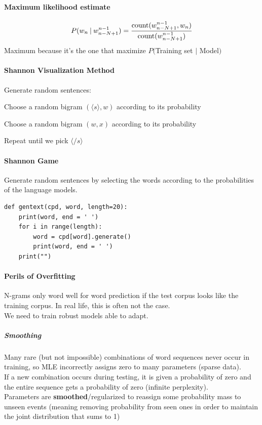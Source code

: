 \documentclass[10pt]{report}
\begin{document}
\paragraph{Maximum likelihood estimate}$$P(w_n\:|\:w_{n-N+1}^{n-1}) = \frac{\hbox{count}(w_{n-N+1}^{n-1},w_n)}{\hbox{count}(w_{n-N+1}^{n-1})}$$
Maximum because it's the one that maximize $P($Training set $|$ Model$)$
\paragraph{Shannon Visualization Method} Generate random sentences:
\begin{list}{}{}
	\item Choose a random bigram $(\langle s\rangle,w)$ according to its probability
	\item Choose a random bigram $(w,x)$ according to its probability
	\item Repeat until we pick $\langle/s\rangle$
\end{list}
\paragraph{Shannon Game} Generate random sentences by selecting the words according to the probabilities of the language models.
\begin{lstlisting}[style=myPython]
def gentext(cpd, word, length=20):
	print(word, end = ' ')
	for i in range(length):
		word = cpd[word].generate()
		print(word, end = ' ')
	print("")
\end{lstlisting}
\paragraph{Perils of Overfitting} N-grams only word well for word prediction if the test corpus looks like the training corpus. In real life, this is often not the case.\\
We need to train robust models able to adapt.
\subparagraph{Smoothing} Many rare (but not impossible) combinations of word sequences never occur in training, so MLE incorrectly assigns zero to many parameters (sparse data).\\
If a new combination occurs during testing, it is given a probability of zero and the entire sequence gets a probability of zero (infinite perplexity).\\
Parameters are \textbf{smoothed}/regularized to reassign some probability mass to unseen events (meaning removing probability from seen ones in order to maintain the joint distribution that sums to 1)
\end{document}
